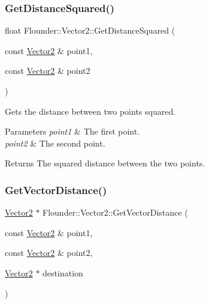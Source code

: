 \subsubsection{\texorpdfstring{Get\+Distance\+Squared()}{GetDistanceSquared()}}
{\footnotesize\ttfamily float Flounder\+::\+Vector2\+::\+Get\+Distance\+Squared (\begin{DoxyParamCaption}\item[{const \hyperlink{class_flounder_1_1_vector2}{Vector2} \&}]{point1,  }\item[{const \hyperlink{class_flounder_1_1_vector2}{Vector2} \&}]{point2 }\end{DoxyParamCaption})\hspace{0.3cm}{\ttfamily [static]}}



Gets the distance between two points squared. 


\begin{DoxyParams}{Parameters}
{\em point1} & The first point. \\
\hline
{\em point2} & The second point. \\
\hline
\end{DoxyParams}
\begin{DoxyReturn}{Returns}
The squared distance between the two points. 
\end{DoxyReturn}
\mbox{\label{class_flounder_1_1_vector2_a61641d327a24ba72813d3d55b197df71}} 
\subsubsection{\texorpdfstring{Get\+Vector\+Distance()}{GetVectorDistance()}}
{\footnotesize\ttfamily \hyperlink{class_flounder_1_1_vector2}{Vector2} $\ast$ Flounder\+::\+Vector2\+::\+Get\+Vector\+Distance (\begin{DoxyParamCaption}\item[{const \hyperlink{class_flounder_1_1_vector2}{Vector2} \&}]{point1,  }\item[{const \hyperlink{class_flounder_1_1_vector2}{Vector2} \&}]{point2,  }\item[{\hyperlink{class_flounder_1_1_vector2}{Vector2} $\ast$}]{destination }\end{DoxyParamCaption})\hspace{0.3cm}{\ttfamily [static]}}




